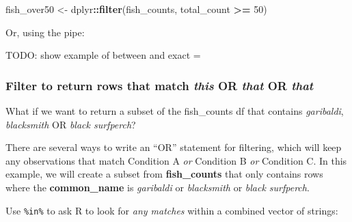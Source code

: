 \documentclass[]{book}
\newenvironment{Shaded}{\begin{snugshade}}{\end{snugshade}}
\newcommand{\DecValTok}[1]{\textcolor[rgb]{0.00,0.00,0.81}{#1}}
\newcommand{\KeywordTok}[1]{\textcolor[rgb]{0.13,0.29,0.53}{\textbf{#1}}}
\newcommand{\NormalTok}[1]{#1}
\newcommand{\OperatorTok}[1]{\textcolor[rgb]{0.81,0.36,0.00}{\textbf{#1}}}
\newcommand{\StringTok}[1]{\textcolor[rgb]{0.31,0.60,0.02}{#1}}
\begin{document}
\begin{Shaded}
\begin{Highlighting}[]
\NormalTok{fish_over50 <-}\StringTok{ }\NormalTok{dplyr}\OperatorTok{::}\KeywordTok{filter}\NormalTok{(fish_counts, total_count }\OperatorTok{>=}\StringTok{ }\DecValTok{50}\NormalTok{)}
\end{Highlighting}
\end{Shaded}

Or, using the pipe:

\begin{Shaded}
\end{Shaded}

TODO: show example of between and exact =

\hypertarget{filter-to-return-rows-that-match-this-or-that-or-that}{%
\subsubsection{\texorpdfstring{Filter to return rows that match \emph{this} OR \emph{that} OR \emph{that}}{Filter to return rows that match this OR that OR that}}\label{filter-to-return-rows-that-match-this-or-that-or-that}}

What if we want to return a subset of the fish\_counts df that contains \emph{garibaldi}, \emph{blacksmith} OR \emph{black surfperch}?

There are several ways to write an ``OR'' statement for filtering, which will keep any observations that match Condition A \emph{or} Condition B \emph{or} Condition C. In this example, we will create a subset from \textbf{fish\_counts} that only contains rows where the \textbf{common\_name} is \emph{garibaldi} or \emph{blacksmith} or \emph{black surfperch}.

Use \texttt{\%in\%} to ask R to look for \emph{any matches} within a combined vector of strings:

\begin{Shaded}
\end{Shaded}
\end{document}
